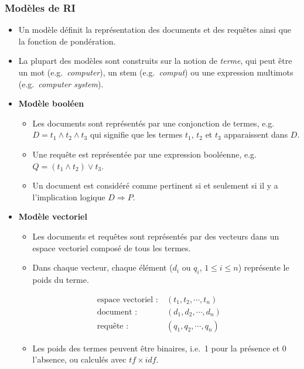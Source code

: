 \documentclass[12pt,aspectratio=43,dvipsnames,table]{beamer}
\begin{document}
\begin{frame}[allowframebreaks]
    \frametitle{Modèles de RI}
    \begin{itemize} \itemsep10pt
        \item Un modèle définit la représentation des documents et des requêtes 
              ainsi que la fonction de pondération.
        \item La plupart des modèles sont construits sur la notion de 
              \textit{terme}, qui peut être un mot (e.g.~\textit{computer}), un 
              stem (e.g.~\textit{comput}) ou une expression multimots 
              (e.g.~\textit{computer system}).

        \framebreak

        \item \textbf{Modèle booléen}
        \begin{itemize}
            \item Les documents sont représentés par une conjonction de termes, 
                  e.g.~$D = t_1 \land t_2 \land t_3$ qui signifie que les termes
                  $t_1$, $t_2$ et $t_3$ apparaissent dans $D$.
            \item Une requête est représentée par une expression booléenne, 
                  e.g.~$Q = (t_1 \land t_2) \lor t_3$.
            \item Un document est considéré comme pertinent si et seulement si 
                  il y a l'implication logique $D \Rightarrow P$.
        \end{itemize}

        \framebreak

        \item \textbf{Modèle vectoriel}~\cite{DBLP:journals/cacm/SaltonWY75,DBLP:books/mg/SaltonG83}
        \begin{itemize}
            \item Les documents et requêtes sont représentés par des vecteurs 
                  dans un espace vectoriel composé de tous les termes.
            \item Dans chaque vecteur, chaque élément ($d_i$ ou $q_i$, 
                  $1 \leq i \leq n$) représente le poids du terme.
        \end{itemize}
        \vspace*{-0.5em}
        \begin{align*}
          \text{espace vectoriel~:} &~(t_1, t_2, \cdots, t_n) \\
          \text{document~:} &~(d_1, d_2, \cdots, d_n) \\
          \text{requête~:} &~(q_1, q_2, \cdots, q_n)
        \end{align*}
        \vspace*{-1.5em}
        \begin{itemize}
            \item Les poids des termes peuvent être binaires, i.e.~1 pour la 
                  présence et 0 l'absence, ou calculés avec $tf \times idf$.


\end{itemize}
\end{itemize}
\end{frame}
\end{document}
